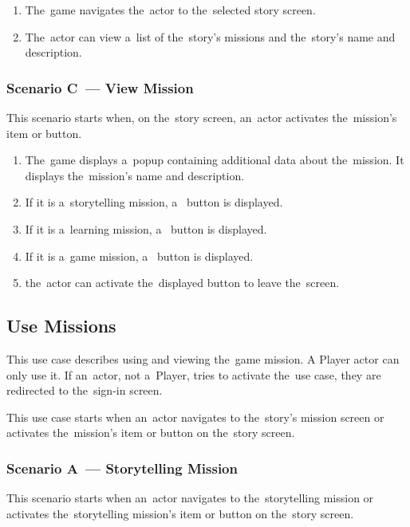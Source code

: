 \begin{enumerate}
    \item The~game navigates the~actor to the~selected story screen.
    \item The~actor can view a~list of the~story's missions and the~story's name and description.
\end{enumerate}

\subsubsection*{Scenario C~--- View Mission}

This scenario starts when, on the~story screen, an~actor activates the~mission's item or button.

\begin{enumerate}
    \item The~game displays a~popup containing additional data about the~mission.
    It displays the~mission's name and description.
    \item If it is a~storytelling mission, a~ button is displayed.
    \item If it is a~learning mission, a~ button is displayed.
    \item If it is a~game mission, a~ button is displayed.
    \item the~actor can activate the~displayed button to leave the~screen.
\end{enumerate}

\pagebreak
\subsection{Use Missions}

This use case describes using and viewing the~game mission.
A Player actor can only use it.
If an~actor, not a~Player, tries to activate the~use case, they are redirected to the~sign-in screen.

This use case starts when an~actor navigates to the~story's mission screen or activates the~mission's item or button on the~story screen.

\subsubsection*{Scenario A~--- Storytelling Mission}

This scenario starts when an~actor navigates to the~storytelling mission or activates the~storytelling mission's item or button on the~story screen.

